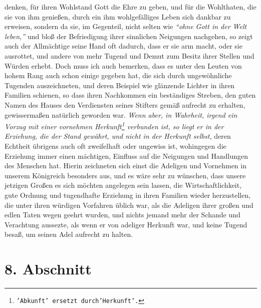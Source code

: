 denken, für ihren Wohlstand Gott die Ehre zu geben, und für die Wohlthaten, die
sie von ihm genießen, durch ein ihm wohlgefälliges Leben sich dankbar zu
erweisen, sondern da sie, im Gegenteil, nicht selten wie
\textit{"`ohne Gott in der
Welt leben,"'} und bloß der Befriedigung ihrer sinnlichen Neigungen nachgehen,
so zeigt auch der Allmächtige seine Hand oft dadurch, dass
er sie arm macht, oder
sie ausrottet, und andere von mehr Tugend und Demut zum
Besitz ihrer Stellen
und Würden erhebt. Doch muss ich auch bemerken, dass es unter den Leuten von
hohem
Rang auch schon einige gegeben hat, die sich durch ungewöhnliche Tugenden
auszeichneten, und deren Beispiel wie glänzende Lichter in ihren Familien
schienen, so dass ihren Nachkommen ein beständiges Streben, den guten Namen des
Hauses den Verdiensten seines Stifters gemäß aufrecht zu erhalten, gewissermaßen
natürlich geworden war. \textit{Wenn aber, in Wahrheit, irgend ein Vorzug mit
einer
vornehmen Herkunft\footnote{\texttt{'Abkunft' ersetzt durch'Herkunft'.}}
verbunden ist, so liegt er in der Erziehung,
die der Stand
gewährt, und nicht in der Herkunft selbst,} deren Echtheit übrigens auch oft
zweifelhaft oder ungewiss ist, wohingegen die Erziehung immer einen mächtigen,
Einfluss auf die Neigungen und Handlungen des Menschen hat. Hierin zeichneten
sich einst die Adeligen und Vornehmen in unserem Königreich besonders aus,
und es wäre sehr zu wünschen, dass unsere jetzigen Großen es sich möchten
angelegen sein lassen, die Wirtschaftlichkeit, gute Ordnung und tugendhafte
Erziehung in ihren Familien wieder herzustellen, die unter ihren würdigen
Vorfahren üblich war, als die Adeligen ihrer großen und edlen Taten wegen
geehrt wurden, und nichts jemand mehr der Schande und Verachtung aussezte, als
wenn er von adeliger Herkunft war, und keine Tugend besaß, um seinen Adel
aufrecht zu halten.

\section{8. Abschnitt} \label{kap11_ab8}

